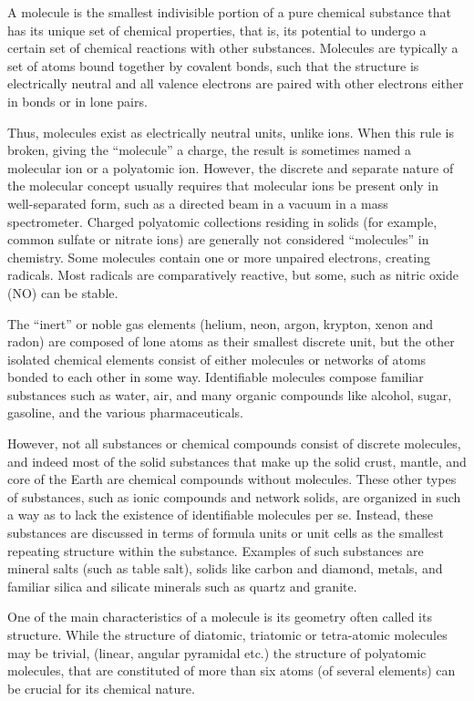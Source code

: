 A molecule is the smallest indivisible portion of a pure chemical substance that has its unique set of chemical properties, that is, its potential to undergo a certain set of chemical reactions with other substances. Molecules are typically a set of atoms bound together by covalent bonds, such that the structure is electrically neutral and all valence electrons are paired with other electrons either in bonds or in lone pairs.

Thus, molecules exist as electrically neutral units, unlike ions. When this rule is broken, giving the ``molecule'' a charge, the result is sometimes named a molecular ion or a polyatomic ion. However, the discrete and separate nature of the molecular concept usually requires that molecular ions be present only in well-separated form, such as a directed beam in a vacuum in a mass spectrometer. Charged polyatomic collections residing in solids (for example, common sulfate or nitrate ions) are generally not considered ``molecules'' in chemistry. Some molecules contain one or more unpaired electrons, creating radicals. Most radicals are comparatively reactive, but some, such as nitric oxide (NO) can be stable.

The ``inert'' or noble gas elements (helium, neon, argon, krypton, xenon and radon) are composed of lone atoms as their smallest discrete unit, but the other isolated chemical elements consist of either molecules or networks of atoms bonded to each other in some way. Identifiable molecules compose familiar substances such as water, air, and many organic compounds like alcohol, sugar, gasoline, and the various pharmaceuticals.

However, not all substances or chemical compounds consist of discrete molecules, and indeed most of the solid substances that make up the solid crust, mantle, and core of the Earth are chemical compounds without molecules. These other types of substances, such as ionic compounds and network solids, are organized in such a way as to lack the existence of identifiable molecules per se. Instead, these substances are discussed in terms of formula units or unit cells as the smallest repeating structure within the substance. Examples of such substances are mineral salts (such as table salt), solids like carbon and diamond, metals, and familiar silica and silicate minerals such as quartz and granite.

One of the main characteristics of a molecule is its geometry often called its structure. While the structure of diatomic, triatomic or tetra-atomic molecules may be trivial, (linear, angular pyramidal etc.) the structure of polyatomic molecules, that are constituted of more than six atoms (of several elements) can be crucial for its chemical nature.

